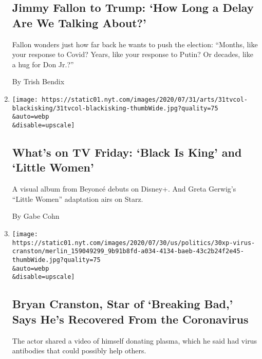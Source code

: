 \begin{enumerate}
  \hypertarget{jimmy-fallon-to-trump-how-long-a-delay-are-we-talking-about}{%
  \subsection{Jimmy Fallon to Trump: `How Long a Delay Are We Talking
  About?'}\label{jimmy-fallon-to-trump-how-long-a-delay-are-we-talking-about}}

  Fallon wonders just how far back he wants to push the election:
  ``Months, like your response to Covid? Years, like your response to
  Putin? Or decades, like a hug for Don Jr.?''

  By Trish Bendix
\item
  \href{/2020/07/31/arts/television/whats-on-tv-friday-black-is-king-and-little-women.html}{}

  \texttt{[image: https://static01.nyt.com/images/2020/07/31/arts/31tvcol-blackisking/31tvcol-blackisking-thumbWide.jpg?quality=75\\\&auto=webp\\\&disable=upscale]}

  \hypertarget{whats-on-tv-friday-black-is-king-and-little-women}{%
  \subsection{What's on TV Friday: `Black Is King' and `Little
  Women'}\label{whats-on-tv-friday-black-is-king-and-little-women}}

  A visual album from Beyoncé debuts on Disney+. And Greta Gerwig's
  ``Little Women'' adaptation airs on Starz.

  By Gabe Cohn
\item
  \href{/2020/07/31/arts/television/bryan-cranston-coronavirus-plasma.html}{}

  \texttt{[image: https://static01.nyt.com/images/2020/07/30/us/politics/30xp-virus-cranston/merlin\_159049299\_9b91b8fd-a034-4134-baeb-43c2b24f2e45-thumbWide.jpg?quality=75\\\&auto=webp\\\&disable=upscale]}

  \hypertarget{bryan-cranston-star-of-breaking-bad-says-hes-recovered-from-the-coronavirus}{%
  \subsection{Bryan Cranston, Star of `Breaking Bad,' Says He's
  Recovered From the
  Coronavirus}\label{bryan-cranston-star-of-breaking-bad-says-hes-recovered-from-the-coronavirus}}

  The actor shared a video of himself donating plasma, which he said had
  virus antibodies that could possibly help others.


\end{enumerate}
